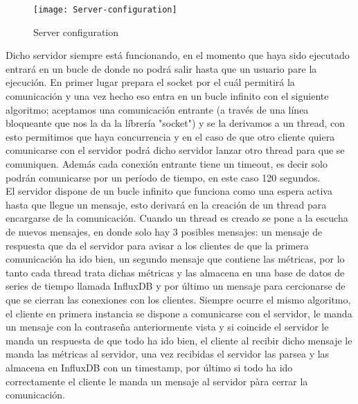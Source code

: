 \documentclass[ spanish, a4paper, 12pt, oneside]{report}
\begin{document}
\begin{figure}[!h]
   \centering
   \texttt{[image: Server-configuration]}\\
      \caption{\label{fig: Server configuration} Server configuration}
\end{figure}

Dicho servidor siempre está funcionando, en el momento que haya sido ejecutado entrará en un bucle de donde no podrá salir hasta que un usuario pare la ejecución. 
En primer lugar prepara el socket por el cuál permitirá la comunicación y una vez hecho eso entra en un bucle infinito con el siguiente algoritmo; aceptamos una comunicación 
entrante (a través de una línea bloqueante que nos la da la líbrería "socket") y se la derivamos a un thread, con esto permitimos que haya concurrencia y en el caso de que 
otro cliente quiera comunicarse con el servidor podrá dicho servidor lanzar otro thread para que se comuniquen. Además cada conexión entrante tiene un timeout, es decir solo podrán 
comunicarse por un período de tiempo, en este caso 120 segundos. \\

El servidor dispone de un bucle infinito que funciona como una espera activa hasta que llegue un mensaje, esto derivará en la creación de un thread para encargarse de la comunicación. Cuando un thread 
es creado se pone a la escucha de nuevos mensajes, en donde solo hay 3 posibles mensajes: un mensaje de respuesta que da el servidor para avisar a los clientes de que la primera comunicación ha ido bien, 
un segundo mensaje que contiene las métricas, por lo tanto cada thread trata dichas métricas y las almacena en una base de datos de series de tiempo llamada InfluxDB y por último un mensaje para cercionarse 
de que se cierran las conexiones con los clientes. Siempre ocurre el mismo algoritmo, el cliente en primera instancia se dispone a comunicarse con el servidor, le manda un mensaje con la contraseña anteriormente 
vista y si coincide el servidor le manda un respuesta de que todo ha ido bien, el cliente al recibir dicho mensaje le manda las métricas al servidor, una vez recibidas el servidor las parsea y las almacena en 
InfluxDB con un timestamp, por último si todo ha ido correctamente el cliente le manda un mensaje al servidor pàra cerrar la comunicación. \\ 
\end{document}

